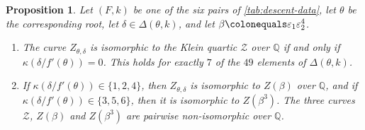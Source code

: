 \documentclass[12pt]{amsart}
\newcommand{\Q}{\mathbb{Q}}
\newcommand{\calZ}{{\mathcal Z}}
\numberwithin{equation}{section}
\newtheorem{proposition}[theorem]{Proposition}
\theoremstyle{definition}
\begin{document}
\begin{proposition}
  \label{prop:klein-twists}
  Let $(F,k)$ be one of the six pairs of \cref{tab:descent-data}, let $\theta$
  be the corresponding root, let $\delta \in \Delta(\theta,k)$, and let $\beta
  \colonequals \varepsilon_1\varepsilon_2^{4}$.
  \begin{enumerate}
  \item \label{item:klein-iff} The curve $Z_{\theta,\delta}$ is isomorphic to
    the Klein quartic $\calZ$ over $\Q$ if and only if
    $\kappa(\delta/f'(\theta)) = 0$. This holds for exactly $7$ of the $49$
    elements of $\Delta(\theta,k)$.
  \item \label{item:two-twists} If $\kappa(\delta/f'(\theta)) \in \{1,2,4\}$,
    then $Z_{\theta,\delta}$ is isomorphic to $Z(\beta)$ over $\Q$, and if
    $\kappa(\delta/f'(\theta)) \in \{3,5,6\}$, then it is isomorphic to
    $Z(\beta^{3})$. The three curves $\calZ$, $Z(\beta)$ and $Z(\beta^{3})$ are pairwise
    non-isomorphic over $\Q$.
  \end{enumerate}
\end{proposition}
\end{document}
